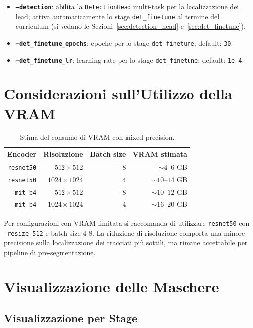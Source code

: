 \begin{itemize}
    \item \textbf{\texttt{--detection}}: abilita la \texttt{DetectionHead} multi-task per la localizzazione dei lead; attiva automaticamente lo stage \texttt{det\_finetune} al termine del curriculum (si vedano le Sezioni~\ref{sec:detection_head} e~\ref{sec:det_finetune}).
    \item \textbf{\texttt{--det\_finetune\_epochs}}: epoche per lo stage \texttt{det\_finetune}; default: \texttt{30}.
    \item \textbf{\texttt{--det\_finetune\_lr}}: learning rate per lo stage \texttt{det\_finetune}; default: \texttt{1e-4}.
\end{itemize}

\section{Considerazioni sull'Utilizzo della VRAM}

\begin{table}[H]
\centering
\caption{Stima del consumo di VRAM con mixed precision.}
\label{tab:extractor_vram}
\begin{tabular}{rrrr}
\hline
\textbf{Encoder} & \textbf{Risoluzione} & \textbf{Batch size} & \textbf{VRAM stimata} \\
\hline
\texttt{resnet50}      & $512 \times 512$   & 8 & $\sim 4$--$6$ GB \\
\texttt{resnet50}      & $1024 \times 1024$ & 4 & $\sim 10$--$14$ GB \\
\texttt{mit-b4}        & $512 \times 512$   & 8 & $\sim 10$--$12$ GB \\
\texttt{mit-b4}        & $1024 \times 1024$ & 4 & $\sim 16$--$20$ GB \\
\hline
\end{tabular}
\end{table}

Per configurazioni con VRAM limitata si raccomanda di utilizzare \texttt{resnet50} con \texttt{--resize 512} e batch size 4-8. La riduzione di risoluzione comporta una minore precisione sulla localizzazione dei tracciati più sottili, ma rimane accettabile per pipeline di pre-segmentazione.

\section{Visualizzazione delle Maschere}

\subsection{Visualizzazione per Stage}

